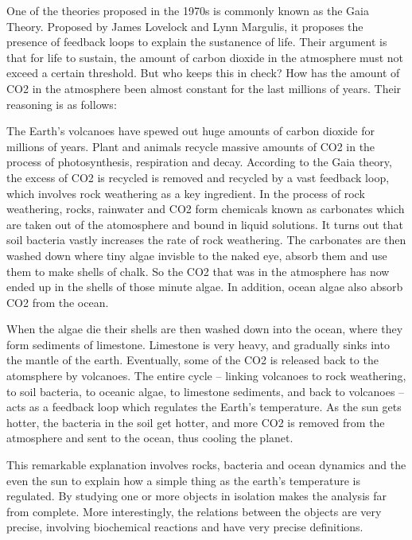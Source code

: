One of the theories proposed in the 1970s is commonly known as the Gaia Theory. Proposed by James Lovelock and Lynn Margulis, it proposes the presence of feedback loops to explain the sustanence of life. Their argument is that for life to sustain, the amount of carbon dioxide in the atmosphere must not exceed a certain threshold. But who keeps this in check? How has the amount of CO2 in the atmosphere been almost constant for the last millions of years. Their reasoning is as follows:

The Earth's volcanoes have spewed out huge amounts of carbon dioxide for millions of years. Plant and animals recycle massive amounts of CO2 in the process of photosynthesis, respiration and decay. According to the Gaia theory, the excess of CO2 is recycled is removed and recycled by a vast feedback loop, which involves rock weathering as a key ingredient. In the process of rock weathering, rocks, rainwater and CO2 form chemicals known as carbonates which are taken out of the atomosphere and bound in liquid solutions. It turns out that soil bacteria vastly increases the rate of rock weathering. The carbonates are then washed down where tiny algae invisble to the naked eye, absorb them and use them to make shells of chalk. So the CO2 that was in the atmosphere has now ended up in the shells of those minute algae. In addition, ocean algae also absorb CO2 from the ocean.  

When the algae die their shells are then washed down into the ocean, where they form sediments of limestone. Limestone is very heavy, and gradually sinks into the mantle of the earth. Eventually, some of the CO2 is released back to the atomsphere by volcanoes. The entire cycle -- linking volcanoes to rock weathering, to soil bacteria, to oceanic algae, to limestone sediments, and back to volcanoes -- acts as a feedback loop which regulates the Earth's temperature. As the sun gets hotter, the bacteria in the soil get hotter, and more CO2 is removed from the atmosphere and sent to the ocean, thus cooling the planet.

This remarkable explanation involves rocks, bacteria and ocean dynamics and the even the sun to explain how a simple thing as the earth's temperature is regulated. By studying one or more objects in isolation makes the analysis far from complete. More interestingly, the relations between the objects are very precise, involving biochemical reactions and have very precise definitions.

